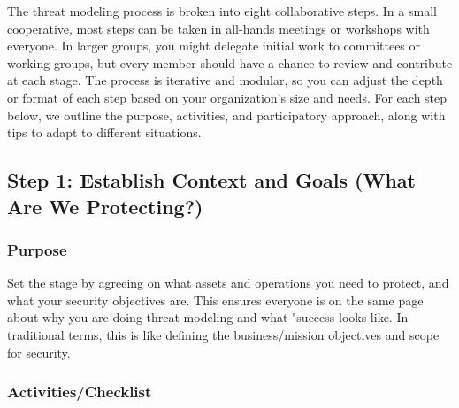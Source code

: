 The threat modeling process is broken into eight collaborative steps. In a small
cooperative, most steps can be taken in all-hands meetings or workshops with
everyone. In larger groups, you might delegate initial work to committees or
working groups, but every member should have a chance to review and contribute
at each stage. The process is iterative and modular, so you can adjust the depth
or format of each step based on your organization's size and needs. For each
step below, we outline the purpose, activities, and participatory approach,
along with tips to adapt to different situations.

\subsection{Step 1: Establish Context and Goals (What Are We Protecting?)}
\label{subsec:Step1}

\subsubsection{Purpose}

Set the stage by agreeing on what assets and operations you need to protect, and
what your security objectives are. This ensures everyone is on the same page
about why you are doing threat modeling and what "success looks like. In
traditional terms, this is like defining the business/mission objectives and
scope for security.

\subsubsection{Activities/Checklist}

